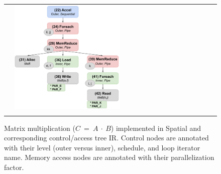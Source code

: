 \begin{figure}
\begin{tabular}{cm{}m{}}
{\hspace{10pt}\usebox{\gemm}} &
{\includegraphics[width=0.55\textwidth]{5-compiler/figs/ctrltree.pdf}} \\
{\parbox{0.4\textwidth}{}} &
{\parbox{0.6\textwidth}{}}
\end{tabular} %
\caption{Matrix multiplication ($C$~=~$A~\cdot~B$) implemented in Spatial and corresponding control/access tree IR. Control nodes are annotated with their level (outer versus inner), schedule, and loop iterator name. Memory access nodes are annotated with their parallelization factor.}
\label{fig:matmult}
\end{figure}
